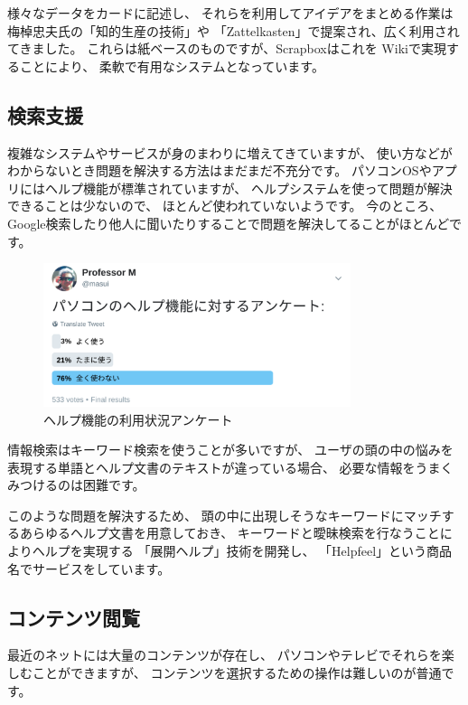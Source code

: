 \documentclass[topics]{compsoft} %
\begin{document}
様々なデータをカードに記述し、
それらを利用してアイデアをまとめる作業は
梅棹忠夫氏の「知的生産の技術」や
「Zattelkasten」で提案され、広く利用されてきました。
これらは紙ベースのものですが、Scrapboxはこれを
Wikiで実現することにより、
柔軟で有用なシステムとなっています。


\subsection{検索支援}

複雑なシステムやサービスが身のまわりに増えてきていますが、
使い方などがわからないとき問題を解決する方法はまだまだ不充分です。
パソコンOSやアプリにはヘルプ機能が標準されていますが、
ヘルプシステムを使って問題が解決できることは少ないので、
ほとんど使われていないようです。
今のところ、Google検索したり他人に聞いたりすることで問題を解決してることがほとんどです。

\begin{figure}[t]
  \includegraphics[width=9cm,bb=0 0 1332 623]{figures/383ee54c265ebbb88778d7ea0fbea5b1.png}
  \caption{ヘルプ機能の利用状況アンケート}
  \label{helpinquiry}
\end{figure}


情報検索はキーワード検索を使うことが多いですが、
ユーザの頭の中の悩みを表現する単語とヘルプ文書のテキストが違っている場合、
必要な情報をうまくみつけるのは困難です。

このような問題を解決するため、
頭の中に出現しそうなキーワードにマッチするあらゆるヘルプ文書を用意しておき、
キーワードと曖昧検索を行なうことによりヘルプを実現する
「展開ヘルプ」\cite{ExpandHelp}技術を開発し、
「Helpfeel」という商品名でサービスをしています。

\subsection{コンテンツ閲覧}

最近のネットには大量のコンテンツが存在し、
パソコンやテレビでそれらを楽しむことができますが、
コンテンツを選択するための操作は難しいのが普通です。
\end{document}
